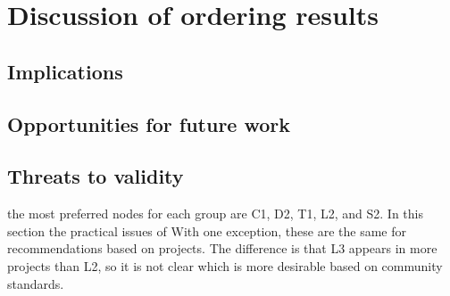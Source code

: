 \section{Discussion of ordering results}
\subsection{Implications}
\subsection{Opportunities for future work}
\subsection{Threats to validity}


 the most preferred nodes for each group are C1, D2, T1, L2, and S2.  In this section the practical issues of
 With one exception, these are the same for recommendations based on projects. The difference is that L3 appears in more projects than L2, so it is not clear which is more desirable based on community standards.

